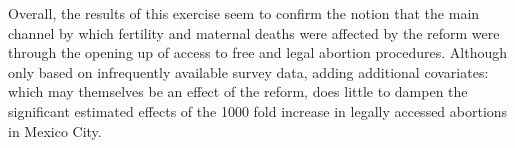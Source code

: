 \documentclass[a4paper, 11pt]{article}
\begin{document}
\begin{spacing}{2}
Overall, the results of this exercise seem to confirm the notion that the main channel by which fertility and maternal deaths were affected by the reform were through the opening up of access to free and legal abortion procedures.  Although only based on infrequently available survey data, adding additional covariates: which may themselves be an effect of the reform, does little to dampen the significant estimated effects of the 1000 fold increase in legally accessed abortions in Mexico City.




\end{spacing}
\end{document}
